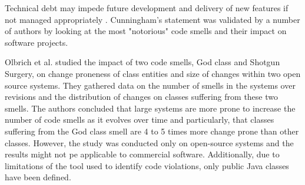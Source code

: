 \documentclass{mprop}
\begin{document}

Technical debt may impede future development and delivery of new features if not
managed appropriately \cite{Cunningham1993}. Cunningham's statement was
validated by a number of authors by looking at the most "notorious" code smells
\cite{Fowler1999} and their impact on software projects.

Olbrich et al. \cite{Olbrich2009} studied the impact of two code smells, God
class and Shotgun Surgery, on change proneness of class entities and size of
changes within two open source systems. They gathered data on the number of
smells in the systems over revisions and the distribution of changes on classes
suffering from these two smells. The authors concluded that large systems are
more prone to increase the number of code smells as it evolves over time and
particularly, that classes suffering from the God class smell are 4 to 5 times
more change prone than other classes. However, the study was conducted only on
open-source systems and the results might not pe applicable to commercial
software. Additionally, due to limitations of the tool used to identify code
violations, only public Java classes have been defined.






\end{document}
